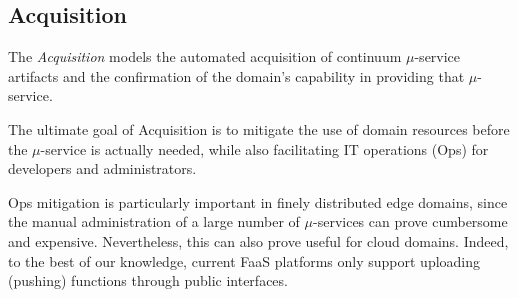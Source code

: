 



\subsection{Acquisition}\label{sec:A3-E-acquisition}


The \textit{Acquisition} models the automated acquisition of continuum $\mu$-service artifacts and the confirmation of the domain's capability in providing that $\mu$-service.

The ultimate goal of Acquisition is to mitigate the use of domain resources before the $\mu$-service is actually needed, while also facilitating IT operations (Ops) for developers and administrators. 


Ops mitigation is particularly important in finely distributed edge domains, since the manual administration of a large number of $\mu$-services can prove cumbersome and expensive. Nevertheless, this can also prove useful for cloud domains. Indeed, to the best of our knowledge, current FaaS platforms only support uploading (pushing) functions through public interfaces. 


